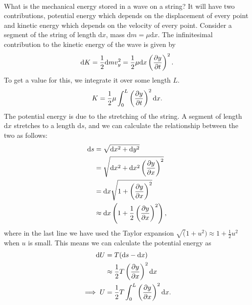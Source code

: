 \documentclass[../newtonian_mechanics.tex]{subfiles}
\begin{document}
        \paragraph{}
        What is the mechanical energy stored in a wave on a string?
        It will have two contributions, potential energy which depends on the displacement of every point and kinetic energy which depends on the velocity of every point.
        Consider a segment of the string of length $\mathrm{d}x$, mass $\mathrm{d}m=\mu\mathrm{d}x$.
        The infinitesimal contribution to the kinetic energy of the wave is given by
        \begin{equation}
            \mathrm{d}K=\frac{1}{2}\mathrm{d}mv_y^2=\frac{1}{2}\mu\mathrm{d}x\left(\pdv{y}{t}\right)^2.
        \end{equation}
        To get a value for this, we integrate it over some length $L$.
        \begin{equation}
            K=\frac{1}{2}\mu\int_{0}^{L}\left(\pdv{y}{t}\right)^2\mathrm{d}x.
        \end{equation}
        The potential energy is due to the stretching of the string.
        A segment of length $\mathrm{d}x$ stretches to a length $\mathrm{d}s$, and we can calculate the relationship between the two as follows:
        \begin{align}
            \mathrm{d}s&=\sqrt{\mathrm{d}x^2+\mathrm{d}y^2}\\
            &=\sqrt{\mathrm{d}x^2+\mathrm{d}x^2\left(\pdv{y}{x}\right)^2}\\
            &=\mathrm{d}x\sqrt{1+\left(\pdv{y}{x}\right)^2}\\
            &\approx\mathrm{d}x\left(1+\frac{1}{2}\left(\pdv{y}{x}\right)^2\right),
        \end{align}
        where in the last line we have used the Taylor expansion $\sqrt(1+u^2)\approx 1+\frac{1}{2}u^2$ when $u$ is small.
        This means we can calculate the potential energy as
        \begin{align}
            \mathrm{d}U&=T(\mathrm{d}s-\mathrm{d}x)\\
            &\approx\frac{1}{2}T\left(\pdv{y}{x}\right)^2\mathrm{d}x\\
            \implies U&=\frac{1}{2}T\int_{0}^{L}\left(\pdv{y}{x}\right)^2\mathrm{d}x.
        \end{align}
\end{document}
